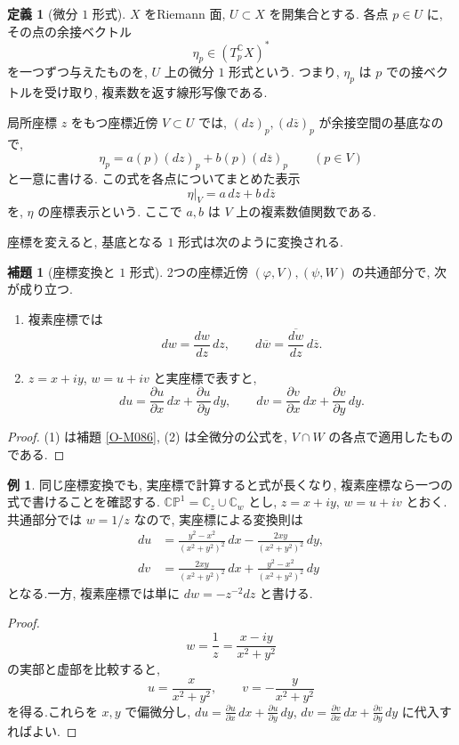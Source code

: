 \documentclass[dvipdfmx,a4paper,11pt]{article} %
\newcommand{\C}{\mathbb{C}}
\theoremstyle{definition}
\numberwithin{equation}{section}
\newtheorem{lem}[thm]{補題}
\newtheorem{dfn}[thm]{定義}
\newtheorem{exa}[thm]{例}
\begin{document}
\begin{dfn}[微分 $1$ 形式]
$X$ をRiemann 面, $U\subset X$ を開集合とする.
各点 $p\in U$ に, その点の余接ベクトル
\[
\eta_p\in(T_p^\C X)^*
\]
を一つずつ与えたものを, $U$ 上の微分 $1$ 形式という.
つまり, $\eta_p$ は $p$ での接ベクトルを受け取り,
複素数を返す線形写像である.

局所座標 $z$ をもつ座標近傍 $V\subset U$ では,
$(dz)_p,(d\overline z)_p$ が余接空間の基底なので,
\[
\eta_p=a(p)(dz)_p+b(p)(d\overline z)_p
\qquad(p\in V)
\]
と一意に書ける.
この式を各点についてまとめた表示
\[
\eta|_V=a\,dz+b\,d\overline z
\]
を, $\eta$ の座標表示という.
ここで $a,b$ は $V$ 上の複素数値関数である.
\end{dfn}

座標を変えると, 基底となる $1$ 形式は次のように変換される.

\begin{lem}[座標変換と $1$ 形式]\label{O-M088}
2つの座標近傍 $(\varphi,V),(\psi,W)$ の共通部分で, 次が成り立つ.
\begin{enumerate}
\item 複素座標では
\[
dw=\frac{dw}{dz}\,dz,\qquad
d\overline w=\overline{\frac{dw}{dz}}\,d\overline z.
\]
\item $z=x+iy$, $w=u+iv$ と実座標で表すと, 
\[
du=\frac{\partial u}{\partial x}\,dx
  +\frac{\partial u}{\partial y}\,dy,\qquad
dv=\frac{\partial v}{\partial x}\,dx
  +\frac{\partial v}{\partial y}\,dy.
\]
\end{enumerate}
\end{lem}

\begin{proof}
(1) は補題 \ref{O-M086}, (2) は全微分の公式を, 
$V\cap W$ の各点で適用したものである.
\end{proof}


\begin{exa}\label{O-M089}
同じ座標変換でも, 実座標で計算すると式が長くなり,
複素座標なら一つの式で書けることを確認する.
$\C\mathbb P^1=\C_z\cup\C_w$ とし, $z=x+iy$, $w=u+iv$ とおく.
共通部分では $w=1/z$ なので, 実座標による変換則は
\[
\begin{aligned}
du&=\frac{y^2-x^2}{(x^2+y^2)^2}\,dx
   -\frac{2xy}{(x^2+y^2)^2}\,dy,\\
dv&=\frac{2xy}{(x^2+y^2)^2}\,dx
   +\frac{y^2-x^2}{(x^2+y^2)^2}\,dy
\end{aligned}
\]
となる.一方, 複素座標では単に $dw=-z^{-2}dz$ と書ける.
\end{exa}

\begin{proof}
\[
w=\frac1z=\frac{x-iy}{x^2+y^2}
\]
の実部と虚部を比較すると, 
\[
u=\frac{x}{x^2+y^2},\qquad
v=-\frac{y}{x^2+y^2}
\]
を得る.これらを $x,y$ で偏微分し, 
$du=\frac{\partial u}{\partial x}\,dx+\frac{\partial u}{\partial y}\,dy$, $dv=\frac{\partial v}{\partial x}\,dx+\frac{\partial v}{\partial y}\,dy$ に代入すればよい.
\end{proof}
\end{document}
